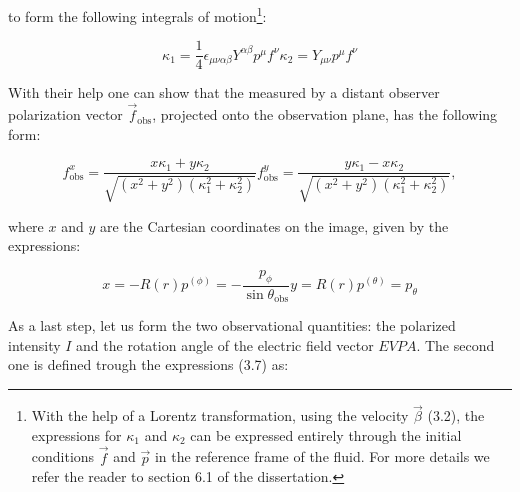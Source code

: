 \documentclass[12pt]{article}
\numberwithin{equation}{section}
\numberwithin{figure}{section}
\begin{document}
	\noindent to form the following integrals of motion\footnote{With the help of a Lorentz transformation, using the velocity $\vec{\beta}$ (3.2), the expressions for $\kappa_1$ and $\kappa_2$ can be expressed entirely through the initial conditions $\vec{f}$ and $\vec{p}$ in the reference frame of the fluid. For more details we refer the reader to section 6.1 of the dissertation.}:
	
	\begin{subequations}
		\begin{equation}
			\kappa_1 = \frac{1}{4}\epsilon_{\mu\nu\alpha\beta}Y^{\alpha\beta}p^\mu f^\nu
		\end{equation}
		\begin{equation}
			\kappa_2 = Y_{\mu\nu}p^\mu f^\nu
		\end{equation}
	\end{subequations}
	
	With their help one can show that the measured by a distant observer polarization vector $\vec{f}_\text{obs}$, projected onto the observation plane, has the following form:
	
	\begin{subequations}
		\begin{equation}
			f^x_\text{obs} = \frac{x\kappa_1 + y\kappa_2}{\sqrt{(x^2 + y^2)(\kappa_1^2 + \kappa_2^2)}}
		\end{equation}
		\begin{equation}
			f^y_\text{obs} = \frac{y \kappa_1 - x\kappa_2}{\sqrt{(x^2 + y^2)(\kappa_1^2 + \kappa_2^2)}},
		\end{equation}
	\end{subequations}
	
	where $x$ and $y$ are the Cartesian coordinates on the image, given by the expressions:
	
	\begin{subequations}
		\begin{equation}
			x = -R(r)p^{(\phi)} = -\frac{p_\phi}{\sin\theta_\text{obs}}
		\end{equation}
		\begin{equation}
			y = R(r)p^{(\theta)} = p_\theta
		\end{equation}
	\end{subequations}
	
	As a last step, let us form the two observational quantities: the polarized intensity $I$ and the rotation angle of the electric field vector $EVPA$. The second one is defined trough the expressions (3.7) as:
	
\end{document}
